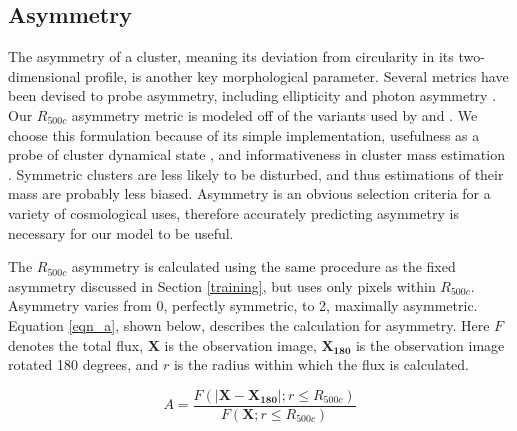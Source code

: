 \documentclass[twocolumn, 11pt]{aastex63}%
\begin{document}
\subsection{Asymmetry}\label{asymmetry}
The asymmetry of a cluster, meaning its deviation from circularity in its two-dimensional profile, is another key morphological parameter. Several metrics have been devised to probe asymmetry, including ellipticity and photon asymmetry \citep[see][]{Ghirardini_2022}. Our $R_{500c}$ asymmetry metric is modeled off of the variants used by \citet{Rasia_2013} and \citet{Green_2019}. We choose this formulation because of its simple implementation, usefulness as a probe of cluster dynamical state \citep{Rasia_2013}, and informativeness in cluster mass estimation \citep{Green_2019}. Symmetric clusters are less likely to be disturbed, and thus estimations of their mass are probably less biased. Asymmetry is an obvious selection criteria for a variety of cosmological uses, therefore accurately predicting asymmetry is necessary for our model to be useful.%

The $R_{500c}$ asymmetry is calculated using the same procedure as the fixed asymmetry discussed in Section \ref{training}, but uses only pixels within $R_{500c}$. Asymmetry varies from 0, perfectly symmetric, to 2, maximally asymmetric. Equation \ref{eqn_a}, shown below, describes the calculation for asymmetry. Here $F$ denotes the total flux, $\mathbf{X}$ is the observation image, $\mathbf{X_{180}}$ is the observation image rotated 180 degrees, and $r$ is the radius within which the flux is calculated.

\begin{equation}\label{eqn_a}
    A = \frac{F(|\mathbf{X}-\mathbf{X_{180}}|;r\leq R_{500c})}{F(\mathbf{X};r\leq R_{500c})}
\end{equation}
\end{document}
